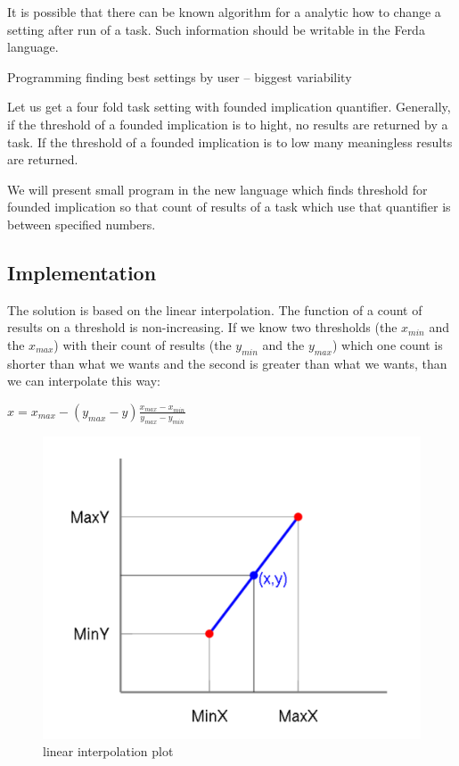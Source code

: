 \documentclass[a4paper,12pt]{book}
\begin{document}
It is possible that there can be known algorithm for a analytic how to change a setting after run of a task. Such information should be writable in the Ferda language.

Programming finding best settings by user -- biggest variability

Let us get a four fold task setting with founded implication quantifier. Generally, if the threshold of a founded implication is to hight, no results are returned by a task. If the threshold of a founded implication is to low many meaningless results are returned.

We will present small program in the new language which finds threshold for founded implication so that count of results of a task which use that quantifier is between specified numbers.

\subsection{Implementation}
The solution is based on the linear interpolation. The function of a count of results on a threshold is non-increasing. If we know two thresholds (the $x_{min}$ and the $x_{max}$) with their count of results (the $y_{min}$ and the $y_{max}$) which one count is shorter than what we wants and the second is greater than what we wants, than we can interpolate this way: 

\begin{math}
x = x_{max} - (y_{max} - y)\frac{x_{max} - x_{min}}{y_{max} - y_{min}}
\end{math}
\begin{figure}
	\includegraphics[width=13.72cm]{linearInterpolationPlot}
	\caption{linear interpolation plot}
\end{figure}
\end{document}
